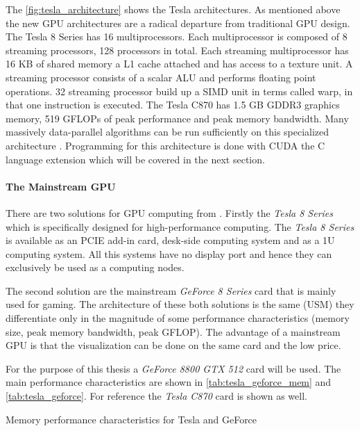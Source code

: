 The \autoref{fig:tesla_architecture} shows the Tesla architectures. As mentioned
above the new \gls{GPU} architectures are a radical departure from traditional
\gls{GPU} design. The Tesla 8 Series has 16 multiprocessors. Each multiprocessor
is composed of 8 streaming processors, 128 processors in total. Each streaming
multiprocessor has 16 \gls{KB} of shared memory a L1 cache attached and has access
to a texture unit. A streaming processor consists of a scalar \gls{ALU} and
performs floating point operations. 32 streaming processor build up a \gls{SIMD}
unit in {} terms called warp, in that one instruction is executed. The Tesla
C870 has 1.5 \gls{GB} \gls{GDDR3} graphics memory, 519 \glspl{GFLOP} of peak
performance and  peak memory bandwidth. Many massively
data-parallel algorithms can be run sufficiently on this specialized
architecture \citep{citeulike:3145468}. Programming for this architecture is
done with \gls{CUDA} the C language extension which will be covered in the next
section.


\paragraph{The Mainstream GPU} %
\label{par:the_mainstream_gpu}
There are two solutions for \gls{GPU} computing from {}. Firstly the
\emph{Tesla 8 Series} which is specifically designed for high-performance
computing. The \emph{Tesla 8 Series} is available as an \gls{PCIE} add-in card,
desk-side computing system and as a \gls{1U} computing system. All this systems have
no display port and hence they can exclusively be used as a computing nodes. 

The second solution are the mainstream \emph{GeForce 8 Series} card that
is mainly used for gaming. The architecture of these both solutions is the same
(\gls{USM}) they differentiate only in the magnitude of some performance
characteristics (memory size, peak memory bandwidth, peak \gls{GFLOP}). The
advantage of a mainstream \gls{GPU} is that the visualization can be done on the
same card and the low price. 

For the purpose of this thesis a \emph{GeForce 8800 GTX 512} card will be
used. The main performance characteristics are shown in
\autoref{tab:tesla_geforce_mem} and \autoref{tab:tesla_geforce}. For reference
the \emph{Tesla C870} card is shown as well.

\begin{table}[ht]
	\centering
  	\caption{Memory performance characteristics for Tesla and GeForce}
  	\label{tab:tesla_geforce_mem}
\end{table}

